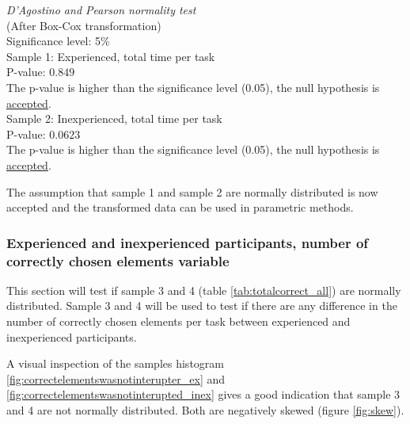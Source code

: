 \begin{center}
	\begin{tcolorbox}[width=0.8\textwidth]
		\centering
		\textit{D'Agostino and Pearson normality test}\\
		(After Box-Cox transformation) \\
		Significance level: 5\%  \\[0.5cm]
		
		Sample 1: Experienced, total time per task\\
		P-value: $0.849$\\
		The p-value is higher than the significance level (0.05), the null hypothesis is \underline{accepted}. \\[0.5cm]
		
		Sample 2: Inexperienced, total time per task \\ %
		P-value: $0.0623$ \\
		The p-value is higher than the significance level (0.05), the null hypothesis is \underline{accepted}. \\[0.5cm]
	\end{tcolorbox}
\end{center}

The assumption that sample 1 and sample 2 are normally distributed is now accepted and the transformed data can be used in parametric methods.

\subsubsection[Sample 3 and 4]{Experienced and inexperienced participants, number of correctly chosen elements variable}\label{sec:correct_ex_inex}
This section will test if sample 3 and 4 (table \ref{tab:totalcorrect_all}) are normally distributed. Sample 3 and 4 will be used to test if there are any difference in the number of correctly chosen elements per task between experienced and inexperienced participants. 

A visual inspection of the samples histogram \ref{fig:correctelementswasnotinterupter_ex} and \ref{fig:correctelementswasnotinterupted_inex} gives a good indication that sample 3 and 4 are not normally distributed. Both are negatively skewed (figure \ref{fig:skew}). 

